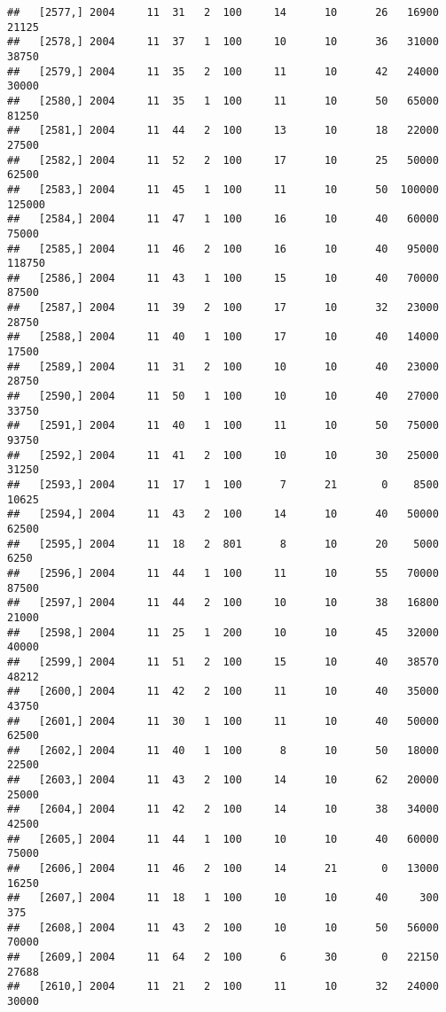 \documentclass{article}\usepackage[]{graphicx}\usepackage[]{color}
\makeatletter
\newenvironment{kframe}{%
 \def\at@end@of@kframe{}%
 \ifinner\ifhmode%
  \def\at@end@of@kframe{\end{minipage}}%
  \begin{minipage}{\columnwidth}%
 \fi\fi%
 \def\FrameCommand##1{\hskip\@totalleftmargin \hskip-\fboxsep
 \colorbox{shadecolor}{##1}\hskip-\fboxsep
     \hskip-\linewidth \hskip-\@totalleftmargin \hskip\columnwidth}%
 \MakeFramed {\advance\hsize-\width
   \@totalleftmargin\z@ \linewidth\hsize
   \@setminipage}}%
 {\par\unskip\endMakeFramed%
 \at@end@of@kframe}
\newenvironment{knitrout}{}{} %
\makeatother
\begin{document}
\begin{knitrout}
\begin{kframe}
\begin{verbatim}
##   [2577,] 2004     11  31   2  100     14      10      26   16900   21125
##   [2578,] 2004     11  37   1  100     10      10      36   31000   38750
##   [2579,] 2004     11  35   2  100     11      10      42   24000   30000
##   [2580,] 2004     11  35   1  100     11      10      50   65000   81250
##   [2581,] 2004     11  44   2  100     13      10      18   22000   27500
##   [2582,] 2004     11  52   2  100     17      10      25   50000   62500
##   [2583,] 2004     11  45   1  100     11      10      50  100000  125000
##   [2584,] 2004     11  47   1  100     16      10      40   60000   75000
##   [2585,] 2004     11  46   2  100     16      10      40   95000  118750
##   [2586,] 2004     11  43   1  100     15      10      40   70000   87500
##   [2587,] 2004     11  39   2  100     17      10      32   23000   28750
##   [2588,] 2004     11  40   1  100     17      10      40   14000   17500
##   [2589,] 2004     11  31   2  100     10      10      40   23000   28750
##   [2590,] 2004     11  50   1  100     10      10      40   27000   33750
##   [2591,] 2004     11  40   1  100     11      10      50   75000   93750
##   [2592,] 2004     11  41   2  100     10      10      30   25000   31250
##   [2593,] 2004     11  17   1  100      7      21       0    8500   10625
##   [2594,] 2004     11  43   2  100     14      10      40   50000   62500
##   [2595,] 2004     11  18   2  801      8      10      20    5000    6250
##   [2596,] 2004     11  44   1  100     11      10      55   70000   87500
##   [2597,] 2004     11  44   2  100     10      10      38   16800   21000
##   [2598,] 2004     11  25   1  200     10      10      45   32000   40000
##   [2599,] 2004     11  51   2  100     15      10      40   38570   48212
##   [2600,] 2004     11  42   2  100     11      10      40   35000   43750
##   [2601,] 2004     11  30   1  100     11      10      40   50000   62500
##   [2602,] 2004     11  40   1  100      8      10      50   18000   22500
##   [2603,] 2004     11  43   2  100     14      10      62   20000   25000
##   [2604,] 2004     11  42   2  100     14      10      38   34000   42500
##   [2605,] 2004     11  44   1  100     10      10      40   60000   75000
##   [2606,] 2004     11  46   2  100     14      21       0   13000   16250
##   [2607,] 2004     11  18   1  100     10      10      40     300     375
##   [2608,] 2004     11  43   2  100     10      10      50   56000   70000
##   [2609,] 2004     11  64   2  100      6      30       0   22150   27688
##   [2610,] 2004     11  21   2  100     11      10      32   24000   30000

\end{verbatim}
\end{kframe}
\end{knitrout}
\end{document}
